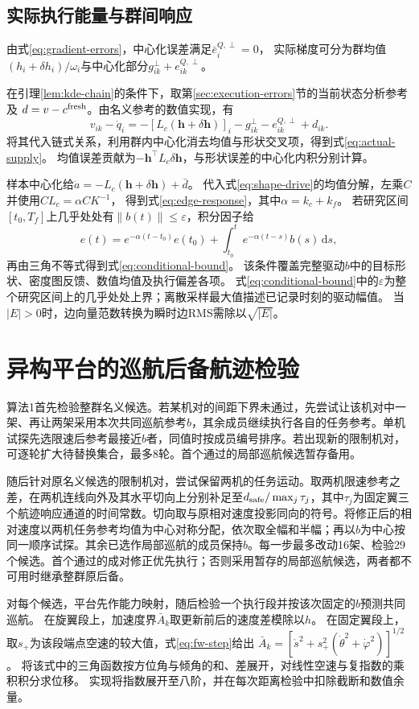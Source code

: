 \documentclass[UTF8,a4paper,11pt,fontset=none]{ctexart}
\begin{document}
\subsection{实际执行能量与群间响应}
由式\eqref{eq:gradient-errors}，中心化误差满足$\bar e_i^{Q,\perp}=0$，
实际梯度可分为群均值$(h_i+\delta h_i)/\omega_i$与中心化部分$g_{ik}^{\perp}+e_{ik}^{Q,\perp}$。

在引理\ref{lem:kde-chain}的条件下，取第\ref{sec:execution-errors}节的当前状态分析参考及
$d=v-c^{\rm fresh}$。由名义参考的数值实现，有
\[
v_{ik}-\dot q_i
=-[L_c(\mathbf h+\delta\mathbf h)]_i-g^\perp_{ik}-e^{Q,\perp}_{ik}+d_{ik} .
\]
将其代入链式关系，利用群内中心化消去均值与形状交叉项，得到式\eqref{eq:actual-supply}。
均值误差贡献为$-\mathbf h^\top L_c\delta\mathbf h$，与形状误差的中心化内积分别计算。

样本中心化给$\dot a=-L_c(\mathbf h+\delta\mathbf h)+\bar d$。
代入式\eqref{eq:shape-drive}的均值分解，左乘$C$并使用$CL_c=\alpha CK^{-1}$，
得到式\eqref{eq:edge-response}，其中$\alpha=k_c+k_f$。
若研究区间$[t_0,T_f]$上几乎处处有$\|b(t)\|\le\varepsilon$，积分因子给
\[
e(t)=e^{-\alpha(t-t_0)}e(t_0)+\int_{t_0}^t e^{-\alpha(t-s)}b(s)\,\mathrm ds,
\]
再由三角不等式得到式\eqref{eq:conditional-bound}。
该条件覆盖完整驱动$b$中的目标形状、密度图反馈、数值均值及执行偏差各项。
式\eqref{eq:conditional-bound}中的$\varepsilon$为整个研究区间上的几乎处处上界；离散采样最大值描述已记录时刻的驱动幅值。
当$|E|>0$时，边向量范数转换为瞬时边RMS需除以$\sqrt{|E|}$。

\section{异构平台的巡航后备航迹检验}\label{app:braking}
算法1首先检验整群名义候选。若某机对的间距下界未通过，先尝试让该机对中一架、再让两架采用本次共同巡航参考$b$，其余成员继续执行各自的任务参考。单机试探先选限速后参考最接近$b$者，同值时按成员编号排序。若出现新的限制机对，可逐轮扩大待替换集合，最多8轮。首个通过的局部巡航候选暂存备用。

随后针对原名义候选的限制机对，尝试保留两机的任务运动。取两机限速参考之差，在两机连线向外及其水平切向上分别补足至$d_{\rm safe}/\max_j\tau_j$，其中$\tau_j$为固定翼三个航迹响应通道的时间常数。切向取与原相对速度投影同向的符号。将修正后的相对速度以两机任务参考均值为中心对称分配，依次取全幅和半幅；再以$b$为中心按同一顺序试探。其余已选作局部巡航的成员保持$b$。每一步最多改动16架、检验29个候选。首个通过的成对修正优先执行；否则采用暂存的局部巡航候选，两者都不可用时继承整群原后备。

对每个候选，平台先作能力映射，随后检验一个执行段并按该次固定的$b$预测共同巡航。
在旋翼段上，加速度界$\bar A_k$取更新前后的速度差模除以$h$。
在固定翼段上，取$s_+$为该段端点空速的较大值，式\eqref{eq:fw-step}给出
$\bar A_k=[\dot s^2+s_+^2(\dot\theta^2+\dot\varphi^2)]^{1/2}$。
将该式中的三角函数按方位角与倾角的和、差展开，对线性空速与复指数的乘积积分求位移。
实现将指数展开至八阶，并在每次距离检验中扣除截断和数值余量。
\end{document}
